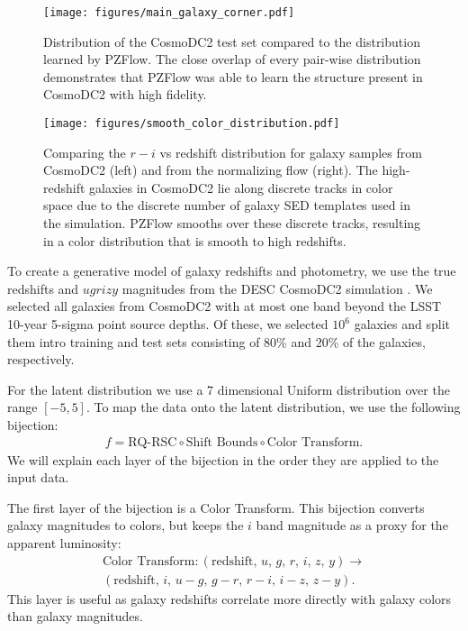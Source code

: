 \documentclass[twocolumn]{aastex631}
\begin{document}
\begin{figure*}[t!]
    \begin{centering}
        \texttt{[image: figures/main\_galaxy\_corner.pdf]}
        \caption{
            Distribution of the CosmoDC2 test set compared to the distribution learned by PZFlow.
            The close overlap of every pair-wise distribution demonstrates that PZFlow was able to learn the structure present in CosmoDC2 with high fidelity.
        }
        \label{fig:main-corner}
    \end{centering}
\end{figure*}

\begin{figure*}[t!]
    \begin{centering}
        \texttt{[image: figures/smooth\_color\_distribution.pdf]}
        \caption{
            Comparing the $r-i$ vs redshift distribution for galaxy samples from CosmoDC2 (left) and from the normalizing flow (right).
            The high-redshift galaxies in CosmoDC2 lie along discrete tracks in color space due to the discrete number of galaxy SED templates used in the simulation.
            PZFlow smooths over these discrete tracks, resulting in a color distribution that is smooth to high redshifts.
        }
        \label{fig:smooth-color-dist}
    \end{centering}
\end{figure*}

To create a generative model of galaxy redshifts and photometry, we use the true redshifts and $ugrizy$ magnitudes from the DESC CosmoDC2 simulation \citep{dc2, cosmodc2}.
We selected all galaxies from CosmoDC2 with at most one band beyond the LSST 10-year 5-sigma point source depths.
Of these, we selected $10^6$ galaxies and split them intro training and test sets consisting of 80\% and 20\% of the galaxies, respectively.

For the latent distribution we use a 7 dimensional Uniform distribution over the range $[-5, 5]$.
To map the data onto the latent distribution, we use the following bijection:
\begin{align}
    f = \text{RQ-RSC} \circ \text{Shift Bounds} \circ \text{Color Transform}.
\end{align}
We will explain each layer of the bijection in the order they are applied to the input data.

The first layer of the bijection is a Color Transform.
This bijection converts galaxy magnitudes to colors, but keeps the $i$ band magnitude as a proxy for the apparent luminosity:
\begin{multline}
    \text{Color Transform} : (\text{redshift},\, u,\, g,\, r,\, i,\, z,\, y) \to \\
    (\text{redshift},\, i,\, u-g,\, g-r,\, r-i,\, i-z,\, z-y).
\end{multline}
This layer is useful as galaxy redshifts correlate more directly with galaxy colors than galaxy magnitudes.
\end{document}
